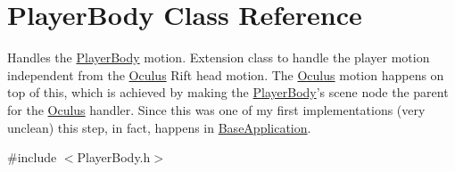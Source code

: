 \hypertarget{classPlayerBody}{\section{\-Player\-Body \-Class \-Reference}
\label{classPlayerBody}
}


\-Handles the \hyperlink{classPlayerBody}{\-Player\-Body} motion. \-Extension class to handle the player motion independent from the \hyperlink{classOculus}{\-Oculus} \-Rift head motion. \-The \hyperlink{classOculus}{\-Oculus} motion happens on top of this, which is achieved by making the \hyperlink{classPlayerBody}{\-Player\-Body}'s scene node the parent for the \hyperlink{classOculus}{\-Oculus} handler. \-Since this was one of my first implementations (very unclean) this step, in fact, happens in \hyperlink{classBaseApplication}{\-Base\-Application}.  




{\ttfamily \#include $<$\-Player\-Body.\-h$>$}

